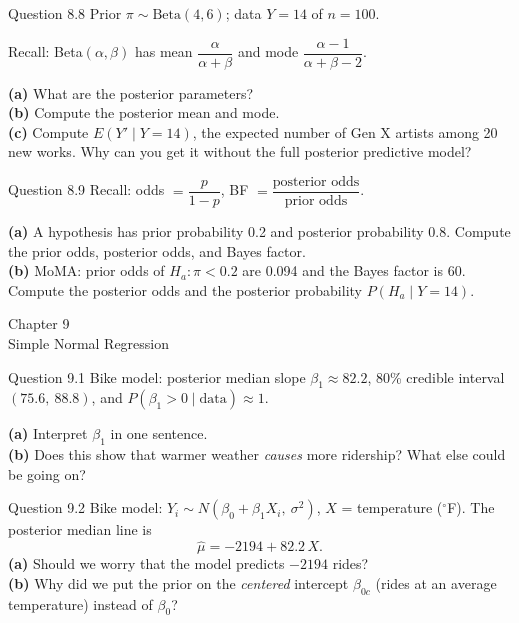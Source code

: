 \documentclass[aspectratio=43,11pt]{beamer}
\newcommand{\divider}[2]{%
  \begin{frame}
    \centering
    {\Large #1}\\[0.6em]
    {\normalsize #2}
  \end{frame}}
\begin{document}
\begin{frame}{Question 8.8}
  Prior $\pi \sim \text{Beta}(4, 6)$; data $Y = 14$ of $n = 100$.
  \vspace{0.3em}

  Recall: Beta$(\alpha, \beta)$ has mean $\dfrac{\alpha}{\alpha + \beta}$
  and mode $\dfrac{\alpha - 1}{\alpha + \beta - 2}$.
  \vspace{0.6em}

  \textbf{(a)} What are the posterior parameters? \\[0.3em]
  \textbf{(b)} Compute the posterior mean and mode. \\[0.3em]
  \textbf{(c)} Compute $E(Y' \mid Y = 14)$, the expected number of Gen X
  artists among 20 new works. Why can you get it without the full
  posterior predictive model?
\end{frame}

\begin{frame}{Question 8.9}
  Recall: odds $= \dfrac{p}{1 - p}$, \quad
  BF $= \dfrac{\text{posterior odds}}{\text{prior odds}}$.
  \vspace{0.6em}

  \textbf{(a)} A hypothesis has prior probability 0.2 and posterior
  probability 0.8. Compute the prior odds, posterior odds, and Bayes
  factor. \\[0.3em]
  \textbf{(b)} MoMA: prior odds of $H_a: \pi < 0.2$ are 0.094 and the
  Bayes factor is 60. Compute the posterior odds and the posterior
  probability $P(H_a \mid Y = 14)$.
\end{frame}

\divider{Chapter 9}{Simple Normal Regression}

\begin{frame}{Question 9.1}
  Bike model: posterior median slope $\beta_1 \approx 82.2$,
  80\% credible interval $(75.6,\ 88.8)$, and
  $P(\beta_1 > 0 \mid \text{data}) \approx 1$.
  \vspace{0.6em}

  \textbf{(a)} Interpret $\beta_1$ in one sentence. \\[0.3em]
  \textbf{(b)} Does this show that warmer weather \emph{causes} more
  ridership? What else could be going on?
\end{frame}

\begin{frame}{Question 9.2}
  Bike model: $Y_i \sim N(\beta_0 + \beta_1 X_i,\ \sigma^2)$,
  $X$ = temperature ($^\circ$F). The posterior median line is
  \[
    \hat\mu = -2194 + 82.2\,X .
  \]
  \textbf{(a)} Should we worry that the model predicts $-2194$ rides? \\[0.3em]
  \textbf{(b)} Why did we put the prior on the \emph{centered} intercept
  $\beta_{0c}$ (rides at an average temperature) instead of $\beta_0$?
\end{frame}
\end{document}
